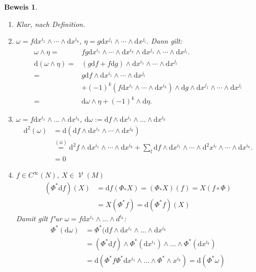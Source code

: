 \documentclass[paper=A4, twoside, chapterprefix=true, bibliography=totoc, headsepline]{scrbook}
\DeclareMathOperator{\calV}{\mathcal{V}}
\newcommand{\dop}{\mathrm{d}}
\theoremstyle{plain}
\theoremstyle{nonumberplain}
\newtheorem{bew}{Beweis}
\theoremstyle{empty}
\theoremstyle{break}
\begin{document}
\begin{bew}
\begin{enumerate}[label=(\roman*),leftmargin=*,widest=iii]
\item
	Klar, nach Definition.
\item
	$\omega = f\dop x^{i_1} \wedge \cdots \wedge \dop x^{i_k}$, $\eta = g \dop x^{j_1} \wedge \cdots \wedge \dop x^{j_l}$. Dann gilt:
	\begin{align*}
		\omega \wedge \eta ={}& fg \dop x^{i_1} \wedge \cdots \wedge \dop x^{i_k} \wedge \dop x^{j_1} \wedge \cdots \wedge \dop x^{j_l}.\\
		\dop (\omega \wedge \eta) ={}& (g \dop f + f \dop g) \wedge \dop x^{i_1} \wedge \cdots \wedge \dop x^{j_l}\\
		={} & g \dop f \wedge \dop x^{i_1} \wedge \cdots \wedge \dop x^{j_l}\\
		& + (-1)^k(f \dop x^{i_1} \wedge \cdots \wedge \dop x^{i_k}) \wedge \dop g \wedge \dop x^{j_1} \wedge \cdots \wedge \dop x^{j_l}\\
		={} & \dop \omega \wedge \eta + (-1)^k \wedge \dop \eta.
	\end{align*}
\item
	$\omega = f \dop x^{i_1} \wedge \ldots  \wedge \dop x^{i_k}$, $\dop \omega := \dop f \wedge \dop x^{i_1} \wedge \ldots \wedge \dop x^{i_k}$
	\begin{align*}
		\dop^2(\omega) & = \dop(\dop f \wedge \dop x^{i_1} \wedge \cdots \wedge \dop x^{i_k})\\
		& \overset{(ii)}{=} \dop^2f \wedge \dop x^{i_1} \wedge \cdots \wedge \dop x^{i_k} + \sum_l \dop f \wedge \dop x^{i_1} \wedge \cdots \wedge \dop^2x^{i_l} \wedge \cdots \wedge \dop x^{i_k}.\\
		& = 0
	\end{align*}
\item
	$f \in C^{\infty}(N)$, $X \in \calV(M)$
	\begin{align*}
		(\Phi^* \dop f)(X) &= \dop f(\Phi_* X) = (\Phi_* X)(f) = X(f \circ \Phi)\\
		&= X(\Phi^* f) = \dop (\Phi^* f)(X)
	\end{align*}
	Damit gilt f"ur $\omega = f \dop x^{i_1} \wedge \ldots \wedge d^{i_k}$:
	\begin{align*}
		\Phi^*(\dop \omega) &= \Phi^*(\dop f \wedge \dop x^{i_1} \wedge \ldots \wedge \dop x^{i_k}\\
		&= (\Phi^* \dop f) \wedge \Phi^*(\dop x^{i_1}) \wedge \ldots \wedge \Phi^*(\dop x^{i_k})\\
		&= \dop (\Phi^* f \Phi^* \dop x^{i_1} \wedge \ldots \wedge \Phi^* \wedge x^{i_k}) = \dop (\Phi^* \omega)
	\end{align*}
\end{enumerate}\end{bew}
\end{document}

